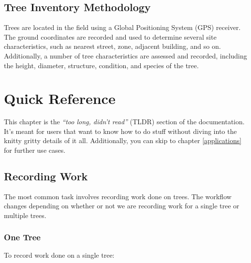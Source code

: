 \documentclass[]{book}
\begin{document}
\hypertarget{tree-inventory-methodology}{%
\section{Tree Inventory Methodology}\label{tree-inventory-methodology}}

Trees are located in the field using a Global Positioning System (GPS)
receiver. The ground coordinates are recorded and used to determine
several site characteristics, such as nearest street, zone, adjacent
building, and so on. Additionally, a number of tree characteristics are
assessed and recorded, including the height, diameter, structure,
condition, and species of the tree.

\hypertarget{quick-references}{%
\chapter{Quick Reference}\label{quick-references}}

This chapter is the \emph{``too long, didn't read''} (TLDR) section of
the documentation. It's meant for users that want to know how to do
stuff without diving into the knitty gritty details of it all.
Additionally, you can skip to chapter \ref{applications} for further use
cases.

\hypertarget{recording-work}{%
\section{Recording Work}\label{recording-work}}

The most common task involves recording work done on trees. The workflow
changes depending on whether or not we are recording work for a single
tree or multiple trees.

\hypertarget{one-tree}{%
\subsection{One Tree}\label{one-tree}}

To record work done on a single tree:
\end{document}
